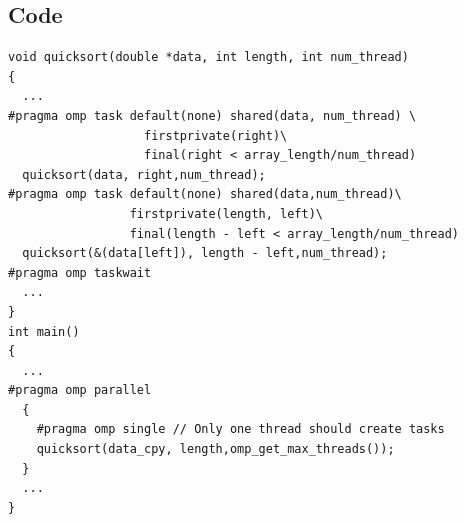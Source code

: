 \documentclass[article]{scrartcl}
\begin{document}
\subsection{Code}
\begin{lstlisting}[frame=single]
void quicksort(double *data, int length, int num_thread)
{
  ...
#pragma omp task default(none) shared(data, num_thread) \
                   firstprivate(right)\ 
                   final(right < array_length/num_thread)
  quicksort(data, right,num_thread);
#pragma omp task default(none) shared(data,num_thread)\ 
                 firstprivate(length, left)\ 
                 final(length - left < array_length/num_thread)
  quicksort(&(data[left]), length - left,num_thread);
#pragma omp taskwait
  ...
}
int main()
{
  ...
#pragma omp parallel
  {
    #pragma omp single // Only one thread should create tasks
    quicksort(data_cpy, length,omp_get_max_threads());
  }
  ...
}
\end{lstlisting}
\end{document}
